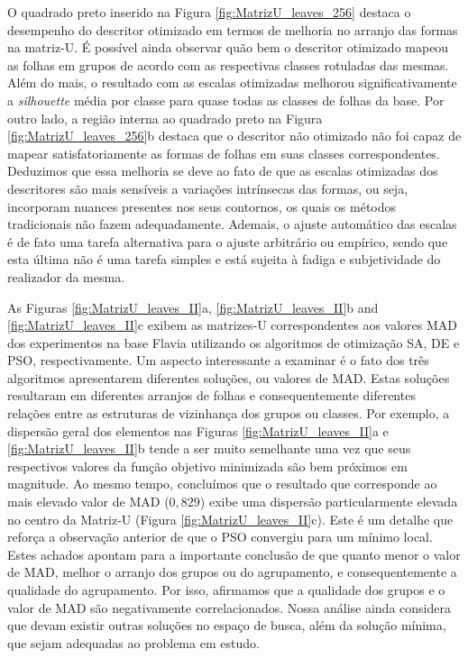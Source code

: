O quadrado preto inserido na Figura \ref{fig:MatrizU_leaves_256} destaca o desempenho do descritor otimizado em termos de melhoria no arranjo das formas na matriz-U. É possível ainda observar quão bem o descritor otimizado mapeou as folhas em grupos de acordo com as respectivas classes rotuladas das mesmas.  Além do mais, o resultado com as escalas otimizadas melhorou significativamente a \emph{silhouette} média por classe para quase todas as classes de folhas da base. Por outro lado, a região interna ao quadrado preto na Figura \ref{fig:MatrizU_leaves_256}b destaca que o descritor não otimizado não foi capaz de mapear satisfatoriamente as formas de  folhas em suas classes correspondentes. Deduzimos que essa melhoria se deve ao fato de que as escalas otimizadas dos descritores são mais sensíveis a variações intrínsecas das formas, ou seja, incorporam nuances presentes nos seus contornos, os quais os métodos tradicionais não fazem adequadamente. Ademais, o ajuste automático das escalas é de fato uma tarefa alternativa para o ajuste arbitrário ou empírico, sendo que esta última não é uma tarefa simples e está sujeita à fadiga e subjetividade do realizador da mesma.


As Figuras \ref{fig:MatrizU_leaves_II}a, \ref{fig:MatrizU_leaves_II}b and \ref{fig:MatrizU_leaves_II}c exibem as matrizes-U correspondentes aos valores \ac{MAD} dos experimentos na base Flavia utilizando os algoritmos de otimização \ac{SA}, \ac{DE} e \ac{PSO}, respectivamente. Um aspecto interessante a examinar é o fato dos três algoritmos apresentarem diferentes soluções, ou valores de \ac{MAD}. Estas soluções resultaram em diferentes arranjos de folhas e consequentemente diferentes relações entre as estruturas de vizinhança dos grupos ou classes.
Por exemplo, a dispersão geral dos elementos nas Figuras \ref{fig:MatrizU_leaves_II}a e \ref{fig:MatrizU_leaves_II}b tende a ser muito semelhante uma vez que seus respectivos valores da função objetivo minimizada são bem próximos em magnitude. Ao mesmo tempo, concluímos que o resultado que corresponde ao mais elevado valor de \ac{MAD} ($0,829$) exibe uma dispersão particularmente elevada no centro da Matriz-U (Figura \ref{fig:MatrizU_leaves_II}c). Este é um detalhe que reforça a observação anterior de que o \ac{PSO} convergiu para um mínimo local. 
Estes achados apontam para a importante conclusão de que quanto menor o valor de \ac{MAD}, melhor o arranjo dos grupos ou do agrupamento, e consequentemente a qualidade do agrupamento. Por isso, afirmamos que a qualidade dos grupos e o valor de \ac{MAD} são negativamente correlacionados. Nossa análise ainda considera que devam existir outras soluções no espaço de busca, além da solução mínima, que sejam adequadas ao problema em estudo.

